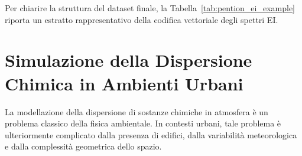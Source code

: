 Per chiarire la struttura del dataset finale, la Tabella~\ref{tab:pention_ei_example} riporta un estratto rappresentativo della codifica vettoriale degli spettri EI.

\begin{table}[H]
    \centering
    \footnotesize
    \caption{Esempio di rappresentazione vettoriale degli spettri EI nel dataset \texttt{PENTION\_EI\_Complete}.}
    \label{tab:pention_ei_example}
\end{table}

\section{Simulazione della Dispersione Chimica in Ambienti Urbani}
\label{sec:dispersion}

La modellazione della dispersione di sostanze chimiche in atmosfera è un problema classico della fisica ambientale.
In contesti urbani, tale problema è ulteriormente complicato dalla presenza di edifici, dalla variabilità meteorologica e dalla complessità geometrica dello spazio.

